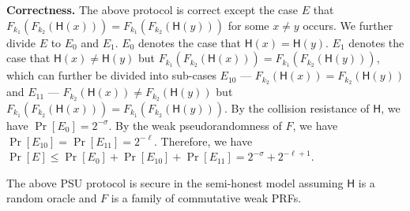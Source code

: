 \begin{trivlist}
\item \textbf{Correctness.} The above protocol is correct except the case $E$ that 
    $F_{k_1}(F_{k_2}(\mathsf{H}(x))) = F_{k_1}(F_{k_2}(\mathsf{H}(y)))$ for some $x \neq y$ occurs. 
    We further divide $E$ to $E_0$ and $E_1$. 
    $E_0$ denotes the case that $\mathsf{H}(x) = \mathsf{H}(y)$. 
    $E_1$ denotes the case that $\mathsf{H}(x) \neq \mathsf{H}(y)$ 
    but $F_{k_1}(F_{k_2}(\mathsf{H}(x))) = F_{k_1}(F_{k_2}(\mathsf{H}(y)))$, 
    which can further be divided into sub-cases $E_{10}$ — $F_{k_2}(\mathsf{H}(x)) = F_{k_2}(\mathsf{H}(y))$ 
    and $E_{11}$ — $F_{k_2}(\mathsf{H}(x)) \neq F_{k_2}(\mathsf{H}(y))$ but 
    $F_{k_1}(F_{k_2}(\mathsf{H}(x))) = F_{k_1}(F_{k_2}(\mathsf{H}(y)))$. 
    By the collision resistance of $\mathsf{H}$, we have $\Pr[E_0] = 2^{-\sigma}$. 
    By the weak pseudorandomness of $F$, we have $\Pr[E_{10}] = \Pr[E_{11}] = 2^{-\ell}$. 
    Therefore, we have $\Pr[E] \leq \Pr[E_0] + \Pr[E_{10}] + \Pr[E_{11}] = 2^{-\sigma}+2^{-\ell+1}$. 

\end{trivlist} 

\begin{theorem}
The above PSU protocol is secure in the semi-honest model assuming $\mathsf{H}$ is a random oracle 
and $F$ is a family of commutative weak PRFs.
\end{theorem}

